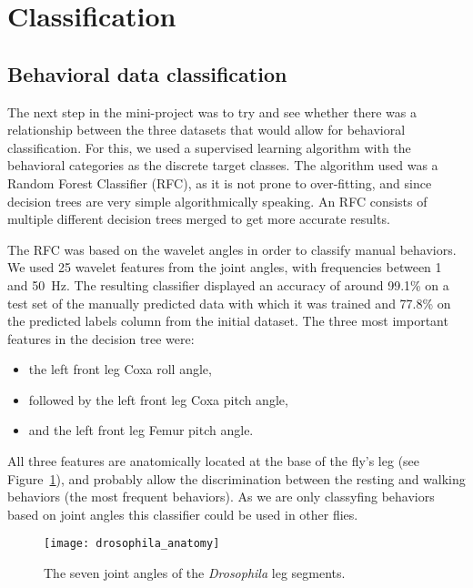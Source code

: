 \section{Classification}

\subsection{Behavioral data classification}

The next step in the mini-project was to try and see whether there was a relationship between the three datasets that would allow for behavioral classification.
For this, we used a supervised learning algorithm with the behavioral categories as the discrete target classes.
The algorithm used was a Random Forest Classifier (RFC), as it is not prone to over-fitting, and since decision trees are very simple algorithmically speaking.
An RFC consists of multiple different decision trees merged to get more accurate results.

\vspace{\baselineskip}

The RFC was based on the wavelet angles in order to classify manual behaviors.
We used 25 wavelet features from the joint angles, with frequencies between 1 and \SI{50}{\hertz}.
The resulting classifier displayed an accuracy of around 99.1\% on a test set of the manually predicted data with which it was trained and 77.8\% on the predicted labels column from the initial dataset.
The three most important features in the decision tree were:
\begin{itemize}
	\item the left front leg Coxa roll angle,
	\item followed by the left front leg Coxa pitch angle,
	\item and the left front leg Femur pitch angle.
\end{itemize}

All three features are anatomically located at the base of the fly's leg (see Figure~\ref{fig::drosophila_anatomy}), and probably allow the discrimination between the resting and walking behaviors (the most frequent behaviors). As we are only classyfing behaviors based on joint angles this classifier could be used in other flies.

\begin{figure}[htbp]
	\begin{center}
		\texttt{[image: drosophila\_anatomy]}
		\caption{The seven joint angles of the \textit{Drosophila} leg segments.}
		\label{fig::drosophila_anatomy}
	\end{center}
\end{figure}

